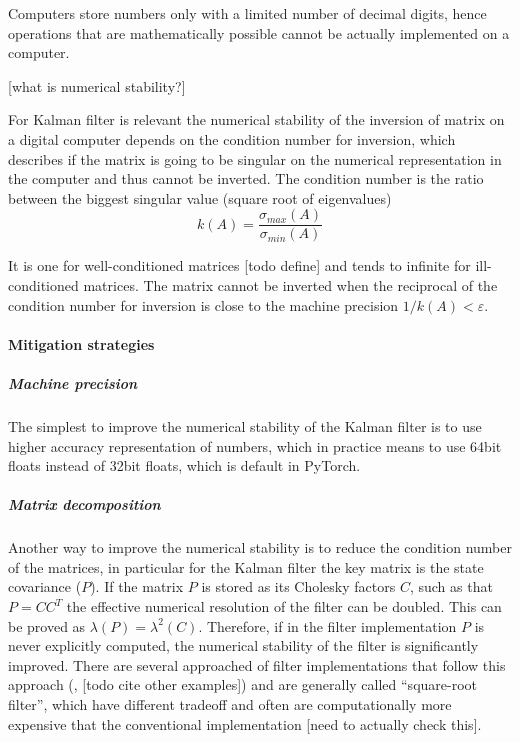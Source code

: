 \documentclass{article}
\begin{document}
Computers store numbers only with a limited number of decimal digits, hence operations that are mathematically possible cannot be actually implemented on a computer.

[what is numerical stability?]

For Kalman filter is relevant the numerical stability of the inversion of matrix on a digital computer depends on the condition number for inversion, which describes if the matrix is going to be singular on the numerical representation in the computer and thus cannot be inverted. The condition number is the ratio between the biggest singular value (square root of eigenvalues)
\begin{equation}\label{condition_number}
    k(A) = \frac{\sigma_{max}(A)}{\sigma_{min}(A)}
\end{equation}

It is one for well-conditioned matrices [todo define] and tends to infinite for ill-conditioned matrices.
The matrix cannot be inverted when the reciprocal of the condition number for inversion is close to the machine precision $ 1/k(A) < \varepsilon$.

\paragraph{Mitigation strategies}

\subparagraph{Machine precision} The simplest to improve the numerical stability of the Kalman filter is to use higher accuracy representation of numbers, which in practice means to use 64bit floats instead of 32bit floats, which is default in PyTorch.

\subparagraph{Matrix decomposition} Another way to improve the numerical stability is to reduce the condition number of the matrices, in particular for the Kalman filter the key matrix is the state covariance ($P$). If the matrix $P$ is stored as its Cholesky factors $C$, such as that $P = CC^T$ the effective numerical resolution of the filter can be doubled. This can be proved as $\lambda(P) = \lambda^2(C)$. Therefore, if in the filter implementation $P$ is never explicitly computed, the numerical stability of the filter is significantly improved.
There are several approached of filter implementations that follow this approach (\cite{potter_statistical_1963}, [todo cite other examples]) and are generally called ``square-root filter'', which have different tradeoff and often are computationally more expensive that the conventional implementation [need to actually check this].
\end{document}
